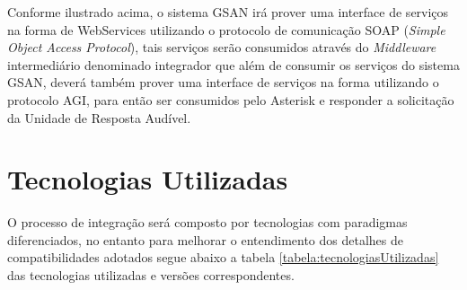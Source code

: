 Conforme ilustrado acima, o sistema GSAN irá prover uma interface de serviços na forma de WebServices utilizando o protocolo de comunicação SOAP (\textit{Simple Object Access Protocol}), tais serviços serão consumidos através do \textit{Middleware} intermediário denominado integrador que além de consumir os serviços do sistema GSAN, deverá também prover uma interface de serviços na forma utilizando o protocolo AGI, para então ser consumidos pelo Asterisk e responder a solicitação da Unidade de Resposta Audível.


\section{Tecnologias Utilizadas}
O processo de integração será composto por tecnologias com paradigmas diferenciados, no entanto para melhorar o entendimento dos detalhes de compatibilidades adotados segue abaixo a tabela \ref{tabela:tecnologiasUtilizadas}
	 das tecnologias utilizadas e versões correspondentes.


